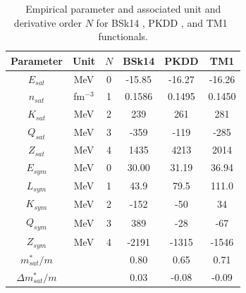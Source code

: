 \begin{table}[!t]
\begin{center}
\begin{tabular}{cccccc} 
  \toprule
  \toprule
  Parameter & Unit & $N$ & BSk14 & PKDD & TM1\\
  \midrule
  $E_{sat}$ & MeV & 0         & -15.85 & -16.27  & -16.26 \\
  $n_{sat}$ & fm$^{-3}$ & 1   & 0.1586 &  0.1495 & 0.1450 \\ 
  $K_{sat}$ & MeV & 2         & 239    &  261    & 281    \\ 
  $Q_{sat}$ & MeV & 3         & -359   &  -119   & -285   \\ 
  $Z_{sat}$ & MeV & 4         & 1435   &  4213   & 2014   \\ 
  $E_{sym}$ & MeV & 0         & 30.00  &  31.19  & 36.94  \\
  $L_{sym}$ & MeV & 1         & 43.9   &  79.5   & 111.0  \\
  $K_{sym}$ & MeV & 2         & -152   &  -50    & 34     \\
  $Q_{sym}$ & MeV & 3         & 389    &  -28    & -67    \\
  $Z_{sym}$ & MeV & 4         & -2191  &  -1315  & -1546  \\
  $m_{sat}^*/m$ & &           & 0.80   &  0.65   & 0.71   \\
  $\Delta m_{sat}^*/m$ & &    & 0.03   &  -0.08  & -0.09  \\
  \bottomrule
  \bottomrule
\end{tabular}
\end{center}
\caption[Empirical parameters for BSk14, PKDD, and TM1]{Empirical parameter and 
  associated unit and derivative order $N$ for BSk14 \cite{Goriely2007}, PKDD
  \cite{Long2004}, and TM1~\cite{Sumiyoshi1995} functionals.}\label{table:newemppar}
\end{table}

